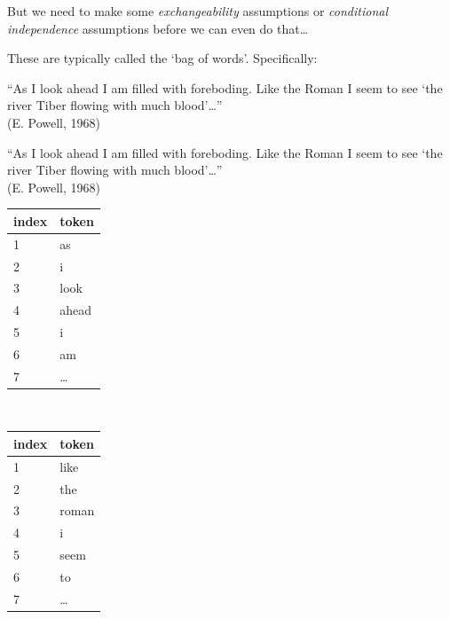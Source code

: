 \documentclass[11pt,compress,professionalfonts]{beamer}
\begin{document}
But we need to make some \textsl{exchangeability} assumptions or 
\textit{conditional independence} assumptions before we can even do that\ldots


These are typically called the `bag of words'.  Specifically:


``As I look ahead I am filled with foreboding.  Like the Roman I seem to see `the river Tiber flowing with much blood'\ldots ''\\
(E. Powell, 1968)



``As I look ahead I am filled with foreboding.  Like the Roman I seem to see `the river Tiber flowing with much blood'\ldots ''\\
(E. Powell, 1968)
\begin{center}
\small
\begin{tabular}{ll}\toprule
index & token\\ \midrule
1 & as\\
2 & i\\
3 & look\\
4 & ahead\\
5 & i\\
6 & am\\
7 & \ldots\\ \bottomrule
\end{tabular}
~~~~~~~~~~
\begin{tabular}{ll}\toprule
index & token\\ \midrule
1 & like\\
2 & the\\
3 & roman\\
4 & i\\
5 & seem\\
6 & to\\
7 & \ldots\\ \bottomrule
\end{tabular}
\normalsize
\end{center}
\end{document}
